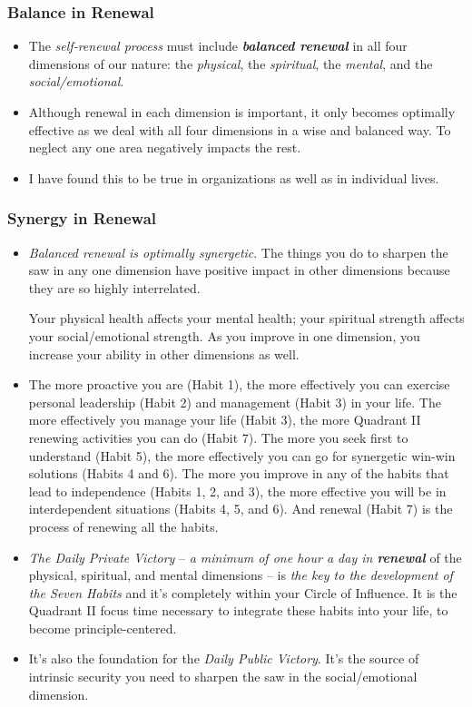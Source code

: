 \documentclass[11pt]{article}
\begin{document}
\subsubsection{Balance in Renewal}
\begin{itemize}
\item  The \emph{self-renewal process} must include \emph{\textbf{balanced renewal}} in all four dimensions of our nature: the \emph{physical}, the \emph{spiritual}, the \emph{mental}, and the \emph{social/emotional}.

\item Although renewal in each dimension is important, it only becomes optimally effective as we deal with all four dimensions in a wise and balanced way. To neglect any one area negatively impacts the rest.

\item I have found this to be true in organizations as well as in individual lives. 

\end{itemize}
\subsubsection{Synergy in Renewal}
\begin{itemize}
\item \emph{Balanced renewal is optimally synergetic}. The things you do to sharpen the saw in any one dimension have positive impact in other dimensions because they are so highly interrelated. 

Your physical health affects your mental health; your spiritual strength affects your social/emotional strength. As you improve in one dimension, you increase your ability in other dimensions as well.

\item The more proactive you are (Habit 1), the more effectively you can exercise personal leadership (Habit 2) and management (Habit 3) in your life. The more effectively you manage your life (Habit 3), the more Quadrant II renewing activities you can do (Habit 7). The more you seek first to understand (Habit 5), the more effectively you can go for synergetic win-win solutions (Habits 4 and 6). The more you improve in any of the habits that lead to independence (Habits 1, 2, and 3), the more effective you will be in interdependent situations (Habits 4, 5, and 6). And renewal (Habit 7) is the process of renewing all the habits.

\item \emph{The Daily Private Victory} -- \emph{a minimum of one hour a day in \textbf{renewal}} of the physical, spiritual, and mental dimensions -- is \emph{the key to the development of the Seven Habits} and it's completely within your Circle of Influence. It is the Quadrant II focus time necessary to integrate these habits into your life, to become principle-centered.

\item It's also the foundation for the \emph{Daily Public Victory}. It's the source of intrinsic security you need to sharpen the saw in the social/emotional dimension.
\end{itemize}
\end{document}
